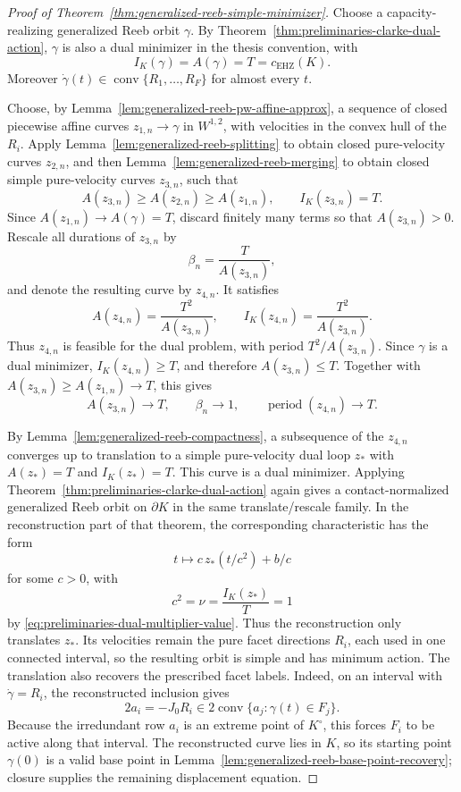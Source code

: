\begin{proof}[Proof of Theorem~\ref{thm:generalized-reeb-simple-minimizer}]
Choose a capacity-realizing generalized Reeb orbit \(\gamma\). By
Theorem~\ref{thm:preliminaries-clarke-dual-action}, \(\gamma\) is also a dual
minimizer in the thesis convention, with
\[
  I_K(\gamma)=A(\gamma)=T=c_{\mathrm{EHZ}}(K).
\]
Moreover \(\dot\gamma(t)\in\operatorname{conv}\{R_1,\ldots,R_F\}\) for almost
every \(t\).

Choose, by Lemma~\ref{lem:generalized-reeb-pw-affine-approx}, a sequence of
closed piecewise affine curves \(z_{1,n}\to\gamma\) in \(W^{1,2}\), with
velocities in the convex hull of the \(R_i\). Apply
Lemma~\ref{lem:generalized-reeb-splitting} to obtain closed pure-velocity
curves \(z_{2,n}\), and then Lemma~\ref{lem:generalized-reeb-merging} to obtain
closed simple pure-velocity curves \(z_{3,n}\), such that
\[
  A(z_{3,n})\geq A(z_{2,n})\geq A(z_{1,n}),
  \qquad
  I_K(z_{3,n})=T.
\]
Since \(A(z_{1,n})\to A(\gamma)=T\), discard finitely many terms so that
\(A(z_{3,n})>0\). Rescale all durations of \(z_{3,n}\) by
\[
  \beta_n=\frac{T}{A(z_{3,n})},
\]
and denote the resulting curve by \(z_{4,n}\). It satisfies
\[
  A(z_{4,n})=\frac{T^2}{A(z_{3,n})},
  \qquad
  I_K(z_{4,n})=\frac{T^2}{A(z_{3,n})}.
\]
Thus \(z_{4,n}\) is feasible for the dual problem, with period
\(T^2/A(z_{3,n})\). Since \(\gamma\) is a dual minimizer,
\(I_K(z_{4,n})\geq T\), and therefore \(A(z_{3,n})\leq T\). Together with
\(A(z_{3,n})\geq A(z_{1,n})\to T\), this gives
\[
  A(z_{3,n})\to T,
  \qquad \beta_n\to1,
  \qquad \operatorname{period}(z_{4,n})\to T.
\]

By Lemma~\ref{lem:generalized-reeb-compactness}, a subsequence of the \(z_{4,n}\)
converges up to translation to a simple pure-velocity dual loop \(z_*\)
with \(A(z_*)=T\) and \(I_K(z_*)=T\). This curve is a dual minimizer. Applying
Theorem~\ref{thm:preliminaries-clarke-dual-action} again gives a
contact-normalized generalized Reeb orbit on \(\partial K\) in the same
translate/rescale family. In the reconstruction part of that theorem, the
corresponding characteristic has the form
\[
  t\longmapsto c\,z_*(t/c^2)+b/c
\]
for some \(c>0\), with
\[
  c^2=\nu=\frac{I_K(z_*)}{T}=1
\]
by \eqref{eq:preliminaries-dual-multiplier-value}. Thus the reconstruction
only translates \(z_*\). Its velocities
remain the pure facet directions \(R_i\), each used in one connected interval,
so the resulting orbit is simple and has minimum action.  The translation also
recovers the prescribed facet labels.  Indeed, on an interval with
\(\dot\gamma=R_i\), the reconstructed inclusion gives
\[
  2a_i=-J_0R_i
  \in 2\operatorname{conv}\{a_j:\gamma(t)\in F_j\}.
\]
Because the irredundant row \(a_i\) is an extreme point of \(K^\circ\), this
forces \(F_i\) to be active along that interval.  The reconstructed curve lies
in \(K\), so its starting point \(\gamma(0)\) is a valid base point in
Lemma~\ref{lem:generalized-reeb-base-point-recovery}; closure supplies the
remaining displacement equation.
\end{proof}

